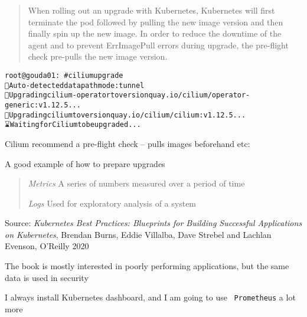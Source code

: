 \documentclass[Screen16to9,17pt]{foils}
\begin{document}

\begin{quote}
When rolling out an upgrade with Kubernetes, Kubernetes will first terminate the pod followed by pulling the new image version and then finally spin up the new image. In order to reduce the downtime of the agent and to prevent ErrImagePull errors during upgrade, the pre-flight check pre-pulls the new image version.
\end{quote}

\begin{alltt}\footnotesize
root@gouda01:~# cilium upgrade
🔮 Auto-detected datapath mode: tunnel
🚀 Upgrading cilium-operator to version quay.io/cilium/operator-generic:v1.12.5...
🚀 Upgrading cilium to version quay.io/cilium/cilium:v1.12.5...
⌛ Waiting for Cilium to be upgraded...

\end{alltt}

\begin{list2}
\item Cilium recommend a pre-flight check -- pulls images beforehand etc:\\
\item A good example of how to prepare upgrades
\end{list2}


\begin{quote}
\emph{Metrics} A series of numbers measured over a period of time

\emph{Logs} Used for exploratory analysis of a system
\end{quote}
Source: \emph{Kubernetes Best Practices: Blueprints for Building Successful Applications on Kubernetes}, Brendan Burns, Eddie Villalba, Dave Strebel and Lachlan Evenson, O'Reilly 2020

\begin{list2}
\item The book is mostly interested in poorly performing applications, but the same data is used in security
\item I always install Kubernetes dashboard, and I am going to use \faWrench\ \verb+Prometheus+ a lot more
\end{list2}

\end{document}
